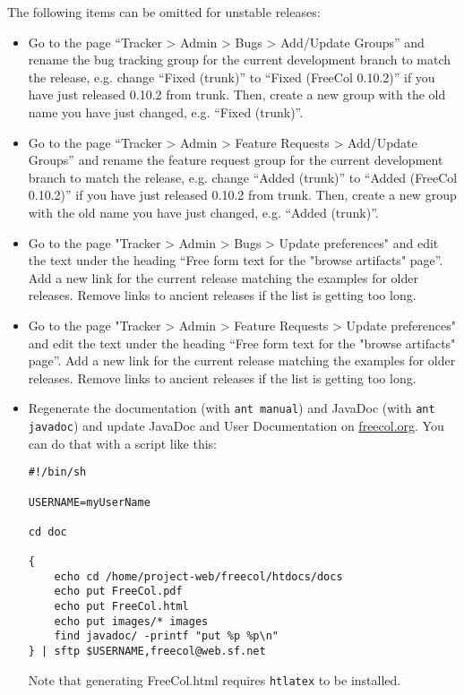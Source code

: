\documentclass[12pt]{book}
\begin{document}
The following items can be omitted for unstable releases:

\begin{itemize}

\item Go to the page ``Tracker > Admin > Bugs > Add/Update Groups''
  and rename the bug tracking group for the current development branch
  to match the release, e.g. change ``Fixed (trunk)'' to ``Fixed
  (FreeCol 0.10.2)'' if you have just released 0.10.2 from
  trunk. Then, create a new group with the old name you have just
  changed, e.g. ``Fixed (trunk)''.

\item Go to the page ``Tracker > Admin > Feature Requests > Add/Update
  Groups'' and rename the feature request group for the current
  development branch to match the release, e.g. change ``Added
  (trunk)'' to ``Added (FreeCol 0.10.2)'' if you have just released
  0.10.2 from trunk. Then, create a new group with the old name you
  have just changed, e.g. ``Added (trunk)''.

\item Go to the page "Tracker > Admin > Bugs > Update preferences" and
  edit the text under the heading ``Free form text for the "browse
  artifacts" page''. Add a new link for the current release matching
  the examples for older releases. Remove links to ancient releases if
  the list is getting too long.

\item Go to the page "Tracker > Admin > Feature Requests > Update
  preferences" and edit the text under the heading ``Free form text
  for the "browse artifacts" page''. Add a new link for the current
  release matching the examples for older releases. Remove links to
  ancient releases if the list is getting too long.

\item Regenerate the documentation (with \verb+ant manual+) and
  JavaDoc (with \verb+ant javadoc+) and update JavaDoc and User
  Documentation on \href{freecol.org}{freecol.org}. You can do that
  with a script like this:

\begin{verbatim}
#!/bin/sh

USERNAME=myUserName

cd doc

{
    echo cd /home/project-web/freecol/htdocs/docs
    echo put FreeCol.pdf
    echo put FreeCol.html
    echo put images/* images
    find javadoc/ -printf "put %p %p\n"
} | sftp $USERNAME,freecol@web.sf.net

\end{verbatim}

Note that generating FreeCol.html requires \verb+htlatex+
to be installed.


\end{itemize}
\end{document}
